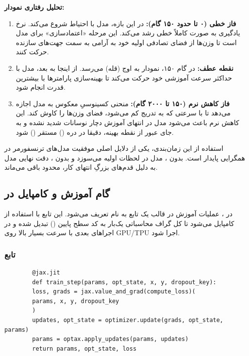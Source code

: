 \documentclass{article}
\begin{document}
\textbf{تحلیل رفتاری نمودار:}
\begin{enumerate}
	\item \textbf{فاز خطی (۰ تا حدود ۱۵۰ گام):} در این بازه، مدل با احتیاط شروع می‌کند. نرخ یادگیری به صورت کاملاً خطی رشد می‌کند. این مرحله «اعتمادسازی» برای مدل است تا وزن‌ها از فضای تصادفی اولیه خود به آرامی به سمت جهت‌های سازنده حرکت کنند.
	\item \textbf{نقطه عطف:} در گام ۱۵۰، نمودار به اوج (قله) می‌رسد. از اینجا به بعد، مدل با حداکثر سرعت آموزشی خود حرکت می‌کند تا بهینه‌سازی پارامترها با بیشترین قدرت انجام شود.
	\item \textbf{فاز کاهش نرم (۱۵۰ تا ۲۰۰۰ گام):} منحنی کسینوسیِ معکوس به مدل اجازه می‌دهد تا با سرعتی که به تدریج کم می‌شود، فضای وزن‌ها را کاوش کند. این کاهش نرم باعث می‌شود مدل در انتهای آموزش دچار نوسانات شدید نشده و به جای عبور از نقطه بهینه، دقیقا در دره () مستقر () شود.
\end{enumerate}

استفاده از این زمان‌بندی، یکی از دلایل اصلی موفقیت مدل‌های ترنسفورمر در همگرایی پایدار است. بدون ، مدل در لحظات اولیه می‌سوزد و بدون ، دقت نهایی مدل به دلیل قدم‌های بزرگِ انتهای کار، محدود باقی می‌ماند.

\subsection{گام آموزش و کامپایل  در }

در ، عملیات آموزش در قالب یک تابع به نام  تعریف می‌شود. این تابع با استفاده از  کامپایل می‌شود تا کل گراف محاسباتی یک‌بار به کد سطح پایین () تبدیل شده و در اجراهای بعدی با سرعت بسیار بالا روی GPU/TPU اجرا شود.

\subsubsection*{تابع }

\begin{latin}
	\begin{verbatim}
		@jax.jit
		def train_step(params, opt_state, x, y, dropout_key):
		loss, grads = jax.value_and_grad(compute_loss)(
		params, x, y, dropout_key
		)
		updates, opt_state = optimizer.update(grads, opt_state, params)
		params = optax.apply_updates(params, updates)
		return params, opt_state, loss
	\end{verbatim}
\end{latin}
\end{document}
